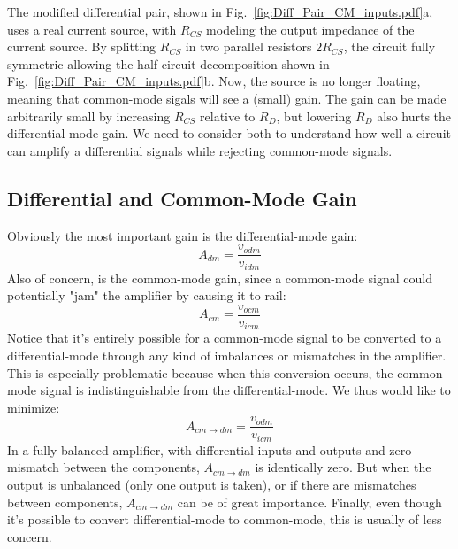 The modified differential pair, shown in Fig.~\ref{fig:Diff_Pair_CM_inputs.pdf}a, uses a real current source, with $R_{CS}$ modeling the output impedance of the current source.  By splitting $R_{CS}$ in two parallel resistors $2R_{CS}$, the circuit fully symmetric allowing the half-circuit decomposition shown in Fig.~\ref{fig:Diff_Pair_CM_inputs.pdf}b.  Now, the source is no longer floating, meaning that common-mode sigals will see a (small) gain.  The gain can be made arbitrarily small by increasing $R_{CS}$ relative to $R_D$, but lowering $R_D$ also hurts the differential-mode gain.  We need to consider both to understand how well a circuit can amplify a differential signals while rejecting common-mode signals.
\subsection{Differential and Common-Mode Gain}
Obviously the most important gain is the differential-mode gain:
    \begin{equation}
        A_{dm} = \frac{v_{odm}}{v_{idm}}
    \end{equation}
Also of concern, is the common-mode gain, since a common-mode signal could potentially "jam" the amplifier by causing it to rail:
    \begin{equation}
        A_{cm} = \frac{v_{ocm}}{v_{icm}}
    \end{equation}
Notice that it's entirely possible for a common-mode signal to be converted to a differential-mode through any kind of imbalances or mismatches in the amplifier.  This is especially problematic because when this conversion occurs, the common-mode signal is indistinguishable from the differential-mode.  We thus would like to minimize:
    \begin{equation}
        A_{cm \to dm} = \frac{v_{odm}}{v_{icm}}
    \end{equation}
In a fully balanced amplifier, with differential inputs and outputs and zero mismatch between the components, $A_{cm \to dm}$ is identically zero.  But when the output is unbalanced (only one output is taken), or if there are mismatches between components, $A_{cm \to dm}$ can be of great importance.  Finally, even though it's possible to convert differential-mode to common-mode, this is usually of less concern.  
